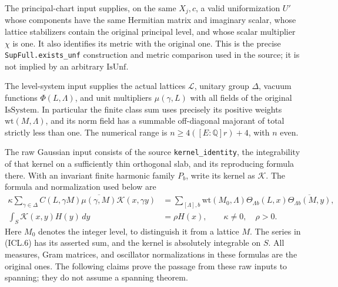 \documentclass[11pt,a4paper]{article}
\numberwithin{equation}{section}
\theoremstyle{remark}\newtheorem{remark}[theorem]{Remark}
\begin{document}
The principal-chart input supplies, on the same \(X_j,c\),
a valid uniformization \(U'\) whose components have the
same Hermitian matrix and imaginary scalar, whose lattice
stabilizers contain the original principal level, and
whose scalar multiplier \(\chi\) is one.  It also identifies
its metric with the original one.  This is the precise
\texttt{Sup\allowbreak Full.\allowbreak exists\_\allowbreak unf} construction and metric
comparison used in the source; it is not implied by an
arbitrary \(\mathrm{IsUnf}\).

The level-system input supplies the actual lattices
\(\mathcal L\), unitary group \(\Delta\), vacuum functions
\(\Phi(L,\Lambda)\), and unit multipliers \(\mu(\gamma,L)\)
with all fields of the original \(\mathrm{IsSystem}\).
In particular the finite class sum uses precisely its
positive weights \(\mathrm{wt}(M,\Lambda)\), and its norm
field has a summable off-diagonal majorant of total
strictly less than one.  The numerical range is
\(n\geq4([E:\mathbb Q]r)+4\), with \(n\) even.

The raw Gaussian input consists of the source
\texttt{kernel\_\allowbreak identity}, the integrability of that
kernel on a sufficiently thin orthogonal slab, and its
reproducing formula there.  With an invariant finite
harmonic family \(P_b\), write its kernel as \(\mathcal K\).
The formula and normalization used below are
\begin{align}
 \kappa\sum_{\gamma\in\Delta}
 C(L,\gamma M)\overline{\mu(\gamma,M)}
 \mathcal K(x,\gamma y)
 &=\sum_{[\Lambda],b}\mathrm{wt}(M_0,\Lambda)
       \Theta_{\Lambda b}(L,x)
       \overline{\Theta_{\Lambda b}(M,y)},             \tag{ICL.6}\\
 \int_S\mathcal K(x,y)H(y)\,dy&=\rho H(x),\qquad
                    \kappa\ne0,\quad\rho>0.          \tag{ICL.7}
\end{align}
Here \(M_0\) denotes the integer level, to distinguish it
from a lattice \(M\).  The series in (ICL.6) has its
asserted sum, and the kernel is absolutely integrable on
\(S\).  All measures, Gram matrices, and oscillator
normalizations in these formulas are the original ones.
The following claims prove the passage from these raw
inputs to spanning; they do not assume a spanning theorem.

\end{document}
